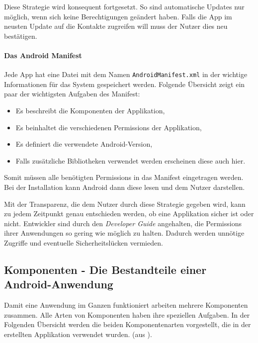 Diese Strategie wird konsequent fortgesetzt. So sind automatische Updates nur möglich, wenn sich keine Berechtigungen geändert haben. Falls die App im neusten Update auf die Kontakte zugreifen will muss der Nutzer dies neu bestätigen.

\paragraph{Das Android Manifest}

Jede App hat eine Datei mit dem Namen \verb+AndroidManifest.xml+ in der wichtige Informationen für das System gespeichert werden. Folgende Übersicht zeigt ein paar der wichtigsten Aufgaben des Manifest:

\begin{itemize}
	\item Es beschreibt die Komponenten der Applikation,
	\item Es beinhaltet die verschiedenen Permissions der Applikation,
	\item Es definiert die verwendete Android-Version,
	\item Falls zusätzliche Bibliotheken verwendet werden erscheinen diese auch hier.
\end{itemize}

Somit müssen alle benötigten Permissions in das Manifest eingetragen werden. Bei der Installation kann Android dann diese lesen und dem Nutzer darstellen.

Mit der Transparenz, die dem Nutzer durch diese Strategie gegeben wird, kann zu jedem Zeitpunkt genau entschieden werden, ob eine Applikation sicher ist oder nicht. Entwickler sind durch den \emph{Developer Guide} \cite{android_api} angehalten, die Permissions ihrer Anwendungen so gering wie möglich zu halten. Dadurch werden unnötige Zugriffe und eventuelle Sicherheitslücken vermieden.

\subsection{Komponenten - Die Bestandteile einer Android-Anwendung}
\label{components}

Damit eine Anwendung im Ganzen funktioniert arbeiten mehrere Komponenten zusammen. Alle Arten von Komponenten haben ihre speziellen Aufgaben. In der Folgenden Übersicht werden die beiden Komponentenarten vorgestellt, die in der erstellten Applikation verwendet wurden. (aus \cite{android_components}).

